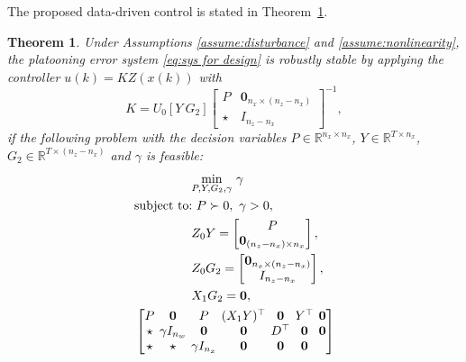 \documentclass[letterpaper, 10 pt, conference]{ieeeconf}
\newtheorem{theorem}{Theorem}[section]
\begin{document}
	The proposed data-driven control is stated in
	Theorem~\ref{thm:control design}.
	\begin{theorem}\label{thm:control design}
		Under Assumptions \ref{assume:disturbance} and \ref{assume:nonlinearity},
		the platooning error system \eqref{eq:sys for design} is robustly stable by 
		applying the controller $u(k) = K Z(x(k))$ with
		\begin{equation}\label{controller:thm}
			K = U_0[Y ~ G_2] \begin{bmatrix}
				P & \mathbf{0}_{n_x \times (n_z-n_x)} \\ \star & I_{n_z-n_x}
			\end{bmatrix}^{-1},
		\end{equation} 
		if the following problem with the decision 
		variables $P \in \mathbb{R}^{n_x \times n_x}$, $Y \in \mathbb{R}^{T \times 
			n_x}$, $G_2 \in \mathbb{R}^{T \times (n_z - n_x)}$ and $\gamma$ is feasible:
		\begin{subequations}\label{op:control design}	
			\begin{align}
				&\hspace{1.6cm}  \underset{P, Y, G_2, \gamma}{\min}~\gamma \nonumber\\
				\label{const:control 1}
				&\text{subject~to:} ~ 
				P \succ 0, ~ \gamma > 0, \\
				\label{const:control 2}
				&\hspace{1.6cm} Z_0 Y = \begin{bmatrix} P \\ \mathbf{0}_{(n_z-n_x) \times n_x}\end{bmatrix}, \\
				\label{const:control 3}
				&\hspace{1.6cm} Z_0 G_2 = \begin{bmatrix} \mathbf{0}_{n_x \times (n_z-n_x)} \\ I_{n_z-n_x} \end{bmatrix}, \\
				\label{const:control 4}
				&\hspace{1.6cm} X_1 G_2 = \mathbf{0}, \\
				\label{const:control 5}
				&
				\setlength\arraycolsep{2pt}
				\begin{bmatrix}
					P  & \mathbf{0} & P & (X_1 Y)^\top & \mathbf{0} & Y^\top & \mathbf{0}\\
					\star & \gamma I_{n_w} & \mathbf{0} & \mathbf{0} & D^\top & \mathbf{0} & 
					\mathbf{0}   \\
					\star & \star & \gamma I_{n_x} & \mathbf{0} & \mathbf{0} & \mathbf{0} & 

\end{bmatrix}
\end{align}
\end{subequations}
\end{theorem}
\end{document}
